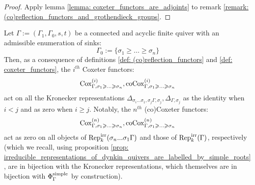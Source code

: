                 \begin{proof}
                    Apply lemma \ref{lemma: coxeter_functors_are_adjoints} to remark \ref{remark: (co)reflection_functors_and_grothendieck_groups}. 
                \end{proof}
            \begin{remark} \label{remark: coxeter_functors_act_as_zero_on_irreducible_representations}
                Let $\Gamma := (\Gamma_1, \Gamma_0, s, t)$ be a connected and acyclic finite quiver with an admissible enumeration of sinks:
                    $$\Gamma_0 := \{\sigma_1 \geq ... \geq \sigma_n\}$$
                Then, as a consequence of definitions \ref{def: (co)reflection_functors} and \ref{def: coxeter_functors}, the $i^{th}$ Coxeter functors:
                    $$\mathrm{Cox}_{\Gamma, \sigma_1 \geqslant ...\geqslant \sigma_n}^{(i)}, \mathrm{co}\mathrm{Cox}_{\Gamma, \sigma_1 \geqslant ...\geqslant \sigma_n}^{(i)}$$
                act on all the Kronecker representations $\Delta_{\sigma_i ... \sigma_1, \sigma_j \Gamma, \sigma_j}, \Delta_{\Gamma, \sigma_j}$ as the identity when $i < j$ and as zero when $i \geq j$. Notably, the $n^{th}$ (co)Coxeter functors:
                    $$\mathrm{Cox}_{\Gamma, \sigma_1 \geqslant ...\geqslant \sigma_n}^{(n)}, \mathrm{co}\mathrm{Cox}_{\Gamma, \sigma_1 \geqslant ...\geqslant \sigma_n}^{(n)}$$
                act as zero on all objects of $\mathrm{Rep}_k^{\mathrm{irr}}(\sigma_n ... \sigma_1 \Gamma)$ and those of $\mathrm{Rep}_k^{\mathrm{irr}}(\Gamma)$, respectively (which we recall, using proposition \ref{prop: irreducible_representations_of_dynkin_quivers_are_labelled_by_simple_roots}, are in bijection with the Kronecker representations, which themselves are in bijection with $\Phi_{\Gamma}^{\mathrm{simple}}$ by construction). 
            \end{remark}
            
